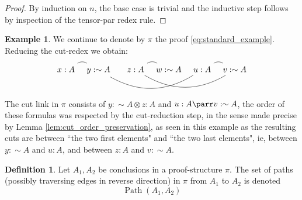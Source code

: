 \documentclass[12pt]{article}
\theoremstyle{plain}
\theoremstyle{definition}
\newtheorem{defn}[thm]{Definition} %
\newtheorem{example}[thm]{Example}
\newcommand{\negation}{\sim}
\begin{document}
\begin{proof}
By induction on $n$, the base case is trivial and the inductive step follows by inspection of the tensor-par redex rule.
\end{proof}
\begin{example}
We continue to denote by $\pi$ the proof \eqref{eq:standard_example}. Reducing the cut-redex we obtain:
\begin{equation}
\begin{tikzcd}[column sep = tiny]
{x:A}\arrow[r,bend left,dash] & {y: \negation A}\arrow[rrrr,bend right,dash] & & {z: A}\arrow[r,bend left,dash]\arrow[rrr,bend right,dash] & {w: \negation A} & {u:A}\arrow[r,bend left,dash] & {v: \negation A}
\end{tikzcd}
\end{equation}
The cut link in $\pi$ consists of $y: \negation A \otimes z: A$ and $u:A \parr v: \negation A$, the order of these formulas was respected by the cut-reduction step, in the sense made precise by Lemma \ref{lem:cut_order_preservation}, as seen in this example as the resulting cuts are between ``the two first elements" and ``the two last elements", ie, between $y: \negation A$ and $u:A$, and between $z:A$ and $v : \negation A$.
\end{example}
\begin{defn}
Let $A_1,A_2$ be conclusions in a proof-structure $\pi$. The set of paths (possibly traversing edges in reverse direction) in $\pi$ from $A_1$ to $A_2$ is denoted
\begin{equation}
\operatorname{Path}(A_1,A_2)
\end{equation}
\end{defn}
\end{document}
